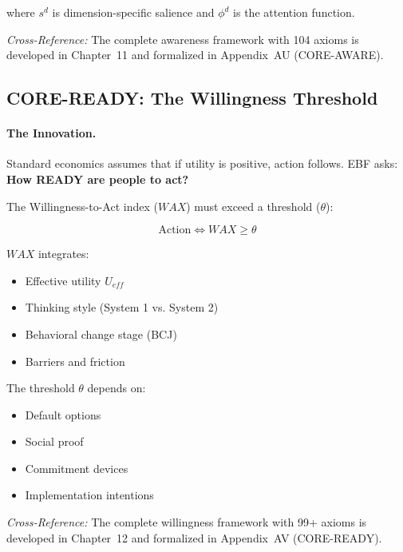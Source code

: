 where $s^d$ is dimension-specific salience and $\phi^d$ is the attention function.

\textit{Cross-Reference:} The complete awareness framework with 104 axioms is
developed in Chapter~11 and formalized in Appendix~AU (CORE-AWARE).

\subsection{CORE-READY: The Willingness Threshold}
\label{sec:8c-ready}

\paragraph{The Innovation.}
Standard economics assumes that if utility is positive, action follows.
EBF asks: \textbf{How READY are people to act?}

The Willingness-to-Act index ($WAX$) must exceed a threshold ($\theta$):

\begin{equation}
\boxed{\text{Action} \Leftrightarrow WAX \geq \theta}
\end{equation}

$WAX$ integrates:
\begin{itemize}[nosep]
\item Effective utility $U_{eff}$
\item Thinking style (System 1 vs. System 2)
\item Behavioral change stage (BCJ)
\item Barriers and friction
\end{itemize}

The threshold $\theta$ depends on:
\begin{itemize}[nosep]
\item Default options
\item Social proof
\item Commitment devices
\item Implementation intentions
\end{itemize}

\textit{Cross-Reference:} The complete willingness framework with 99+ axioms is
developed in Chapter~12 and formalized in Appendix~AV (CORE-READY).

